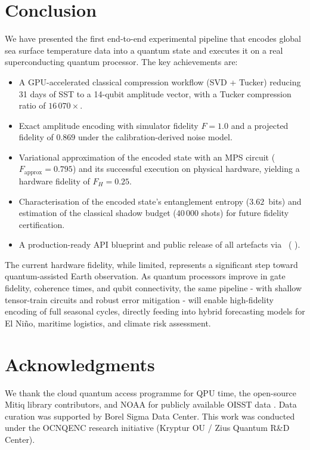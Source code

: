 \documentclass[12pt,a4paper]{article}
\newcommand{\iconlink}[2]{%
  \href{#1}{\raisebox{-0.12ex}{\tikz[baseline=-0.5ex]{\node[draw=gray!60, rounded corners=1pt,
    inner sep=1.5pt, minimum height=0.55cm, minimum width=0.55cm, fill=gray!5] {#2};}}}%
}
\newcommand{\githublink}{\iconlink{https://github.com/BorelSigmaInc/Quantum-Olfacto-Vibration}{GH}}
\newcommand{\zenodolink}{\iconlink{https://doi.org/10.5281/zenodo.20736570}{ZN}}
\newcommand{\noaalink}{\iconlink{https://doi.org/10.1175/2007JCLI1824.1}{NO}}
\begin{document}
\section{Conclusion}
\label{sec:conclusion}
We have presented the first end-to-end experimental pipeline that encodes global sea surface temperature data into a quantum state and executes it on a real superconducting quantum processor. The key achievements are:
\begin{itemize}
  \item A GPU-accelerated classical compression workflow (SVD + Tucker) reducing 31 days of SST to a 14-qubit amplitude vector, with a Tucker compression ratio of $16\,070\times$.
  \item Exact amplitude encoding with simulator fidelity $F=1.0$ and a projected fidelity of $0.869$ under the calibration-derived noise model.
  \item Variational approximation of the encoded state with an MPS circuit ($F_{\text{approx}}=0.795$) and its successful execution on physical hardware, yielding a hardware fidelity of $F_H=0.25$.
  \item Characterisation of the encoded state's entanglement entropy ($3.62$~bits) and estimation of the classical shadow budget ($40\,000$ shots) for future fidelity certification.
  \item A production-ready API blueprint and public release of all artefacts via \githublink\ (\zenodolink).
\end{itemize}

The current hardware fidelity, while limited, represents a significant step toward quantum-assisted Earth observation. As quantum processors improve in gate fidelity, coherence times, and qubit connectivity, the same pipeline - with shallow tensor-train circuits and robust error mitigation - will enable high-fidelity encoding of full seasonal cycles, directly feeding into hybrid forecasting models for El Ni\~{n}o, maritime logistics, and climate risk assessment.

\section*{Acknowledgments}
We thank the cloud quantum access programme for QPU time, the open-source Mitiq library contributors, and NOAA for publicly available OISST data \noaalink. Data curation was supported by Borel Sigma Data Center. This work was conducted under the OCNQENC research initiative (Kryptur OU / Zius Quantum R\&D Center).
\end{document}
